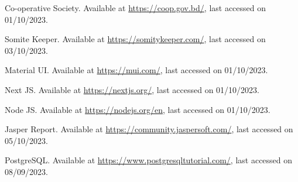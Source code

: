 \begin{thebibliography}{9}
    Co-operative Society. Available at \url{https://coop.gov.bd/}, last accessed on 01/10/2023.
    
    Somite Keeper. Available at \url{https://somitykeeper.com/}, last accessed on 03/10/2023.
    
    Material UI. Available at \url{https://mui.com/}, last accessed on 01/10/2023.
    
    Next JS. Available at \url{https://nextjs.org/}, last accessed on 01/10/2023.
    
    Node JS. Available at \url{https://nodejs.org/en}, last accessed on 01/10/2023.
    
    Jasper Report. Available at \url{https://community.jaspersoft.com/}, last accessed on 05/10/2023.
    
    PostgreSQL. Available at \url{https://www.postgresqltutorial.com/}, last accessed on 08/09/2023.
    
    \end{thebibliography}
    
    